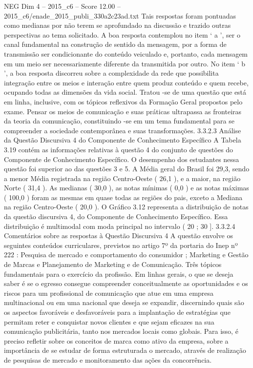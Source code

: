 \begin{textsample}{NEG Dim 4 – 2015\_c6 – Score 12.00 – 2015\_c6/enade\_2015\_publi\_330a2c23ad.txt}
Tais respostas foram pontuadas como medianas por não terem se aprofundado na discussão e trazido outras perspectivas ao tema solicitado.
A boa resposta contemplou no item ‘ a ’, ser o canal fundamental na construção de sentido da mensagem, por a forma de transmissão ser condicionante do conteúdo veiculado e, portanto, cada mensagem em um meio ser necessariamente diferente da transmitida por outro.
No item ‘ b ’, a boa resposta discorreu sobre a complexidade da rede que possibilita integração entre os meios e interação entre quem produz conteúdo e quem recebe, ocupando todas as dimensões da vida social.
Tratou -se de uma questão que está em linha, inclusive, com os tópicos reflexivos da Formação Geral propostos pelo exame.
Pensar os meios de comunicação e suas práticas ultrapassa as fronteiras da teoria da comunicação, constituindo -se em um tema fundamental para se compreender a sociedade contemporânea e suas transformações. 3.3.2.3 Análise da Questão Discursiva 4 do Componente de Conhecimento Específico A Tabela 3.19 contém as informações relativas à questão 4 do conjunto de questões do Componente de Conhecimento Específico.
O desempenho dos estudantes nessa questão foi superior ao das questões 3 e 5.
A Média geral do Brasil foi 29,3, sendo a menor Média registrada na região Centro-Oeste ( 26,1 ), e a maior, na região Norte ( 31,4 ).
As medianas ( 30,0 ), as notas mínimas ( 0,0 ) e as notas máximas ( 100,0 ) foram as mesmas em quase todas as regiões do pais, exceto a Mediana na região Centro-Oeste ( 20,0 ).
O Gráfico 3.12 representa a distribuição de notas da questão discursiva 4, do Componente de Conhecimento Específico.
Essa distribuição é multimodal com moda principal no intervalo ( 20 ; 30 ]. 3.3.2.4 Comentários sobre as respostas à Questão Discursiva 4 A questão envolve os seguintes conteúdos curriculares, previstos no artigo 7º da portaria do Inep nº 222 : Pesquisa de mercado e comportamento do consumidor ; Marketing e Gestão de Marcas e Planejamento de Marketing e de Comunicação.
Três tópicos fundamentais para o exercício da profissão.
Em linhas gerais, o que se deseja saber é se o egresso consegue compreender conceitualmente as oportunidades e os riscos para um profissional de comunicação que atue em uma empresa multinacional ou em uma nacional que deseja se expandir, discernindo quais são os aspectos favoráveis e desfavoráveis para a implantação de estratégias que permitam reter e conquistar novos clientes e que sejam eficazes na sua comunicação publicitária, tanto nos mercados locais como globais.
Para isso, é preciso refletir sobre os conceitos de marca como ativo da empresa, sobre a importância de se estudar de forma estruturada o mercado, através de realização de pesquisas de mercado e monitoramento das ações da concorrência.

\end{textsample}
